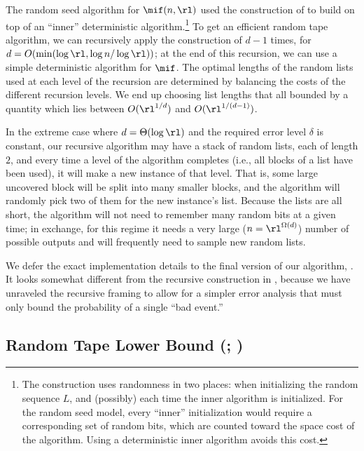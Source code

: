 \begin{itemize}
\begin{itemize}
 The random seed algorithm for
$\mif(n,\rl)$ used the construction of  to build on top
of an ``inner'' deterministic algorithm.\footnote{The construction uses
randomness in two places: when initializing the random sequence $L$, and
(possibly) each time the inner algorithm is initialized. For the random seed
model, every ``inner'' initialization would require a corresponding set of
random bits, which are counted toward the space cost of the algorithm. Using a
deterministic inner algorithm avoids this cost.} To get an efficient random
tape algorithm, we can recursively apply the construction of
 $d - 1$ times, for $d = O(\min(\log \rl, \log n / \log
\rl))$; at the end of this recursion, we can use a simple deterministic
algorithm for $\mif$. The optimal lengths of the random lists used at each
level of the recursion are determined by balancing the costs of the different
recursion levels.  We end up choosing list lengths that all bounded by a
quantity which lies between $O(\rl^{1/d})$ and $O(\rl^{1/(d-1)})$.

In the extreme case where $d = \Theta(\log \rl)$ and the required error level
$\delta$ is constant, our recursive algorithm may have a stack of random
lists, each of length $2$, and every time a level of the algorithm completes
(i.e., all blocks of a list have been used), it will make a new instance of
that level. That is, some large uncovered block will be split into many
smaller blocks, and the algorithm will randomly pick two of them for the new
instance's list. Because the lists are all short, the algorithm will not need
to remember many random bits at a given time; in exchange, for this regime it
needs a very large ($n = \rl^{\Omega(d)}$) number of possible outputs and will
frequently need to sample new random lists.

We defer the exact implementation details to the final version of our
algorithm, .  It looks somewhat different from the recursive
construction in , because we have unraveled the recursive
framing to allow for a simpler error analysis that must only bound the
probability of a single ``bad event.''

\subsection{Random Tape Lower Bound\texorpdfstring{ (; )}{}} \label{subsec:rt-lb-overview}


\end{itemize}
\end{itemize}
